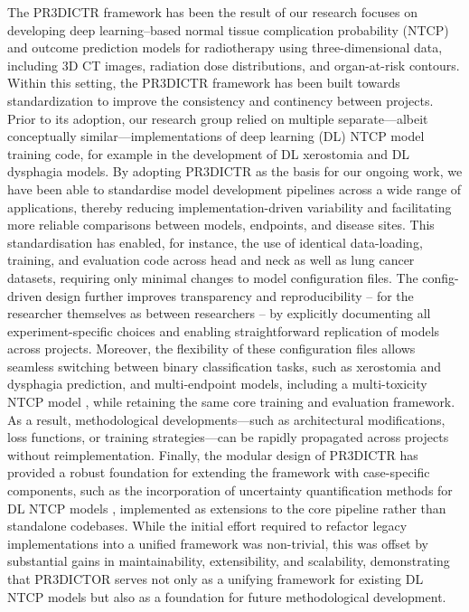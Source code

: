\documentclass[11pt]{article}
\begin{document}
The PR3DICTR framework has been the result of our research focuses on developing deep learning–based normal tissue complication probability (NTCP) and outcome prediction models for radiotherapy using three-dimensional data, including 3D CT images, radiation dose distributions, and organ-at-risk contours. Within this setting, the PR3DICTR framework has been built towards standardization to improve the consistency and continency between projects. Prior to its adoption, our research group relied on multiple separate—albeit conceptually similar—implementations of deep learning (DL) NTCP model training code, for example in the development of DL xerostomia \cite{Chu2025}  and DL dysphagia \cite{deVette2025} models. By adopting PR3DICTR as the basis for our ongoing work, we have been able to standardise model development pipelines across a wide range of applications, thereby reducing implementation-driven variability and facilitating more reliable comparisons between models, endpoints, and disease sites. This standardisation has enabled, for instance, the use of identical data-loading, training, and evaluation code across head and neck as well as lung cancer datasets, requiring only minimal changes to model configuration files. The config-driven design further improves transparency and reproducibility – for the researcher themselves as between researchers – by explicitly documenting all experiment-specific choices and enabling straightforward replication of models across projects. Moreover, the flexibility of these configuration files allows seamless switching between binary classification tasks, such as xerostomia \cite{Chu2025} and dysphagia \cite{deVette2025} prediction, and multi-endpoint models, including a multi-toxicity NTCP model \cite{MacRae2026}, while retaining the same core training and evaluation framework. As a result, methodological developments—such as architectural modifications, loss functions, or training strategies—can be rapidly propagated across projects without reimplementation. Finally, the modular design of PR3DICTR has provided a robust foundation for extending the framework with case-specific components, such as the incorporation of uncertainty quantification methods for DL NTCP models \cite{MacRae2025}, implemented as extensions to the core pipeline rather than standalone codebases. While the initial effort required to refactor legacy implementations into a unified framework was non-trivial, this was offset by substantial gains in maintainability, extensibility, and scalability, demonstrating that PR3DICTOR serves not only as a unifying framework for existing DL NTCP models but also as a foundation for future methodological development.
\end{document}
